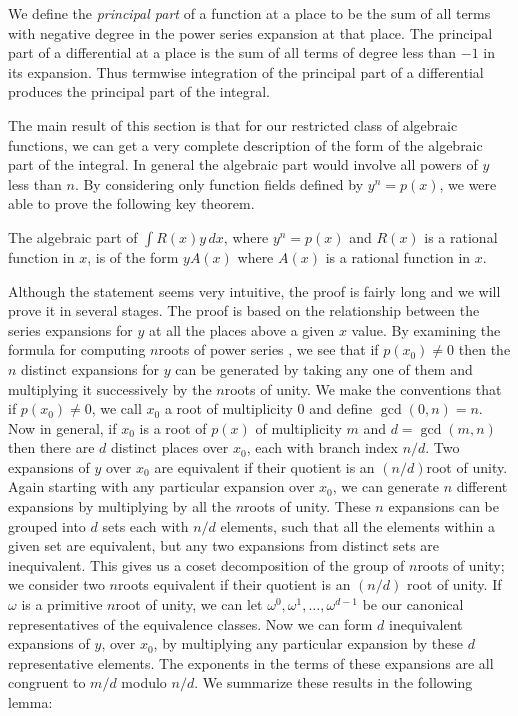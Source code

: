 We define the {\em principal part} of a function at a place to be
the sum of all terms with negative degree in the power series expansion
at that place.  The principal part of a differential  at a place
is the sum of
all terms of degree less than $-1$ in its expansion.  Thus termwise
integration of the principal part of a differential produces the
principal part of the integral.

The main result of this section is that for our restricted
class of algebraic functions, we can get a very complete description
of the form of the algebraic part of the integral.  In general the
algebraic part would involve all powers of $y$ less than $n$.  By considering
only function fields defined by $y^n=p(x)$, we were able to prove the
following key theorem.
	
\begin{theorem}
The algebraic part of $\int R(x)y\,dx$, where $y^n=p(x)$ and $R(x)$ is
a rational function in $x$, is of the form $yA(x)$ where $A(x)$ is a
rational function in $x$.
\end{theorem}

Although the statement seems very intuitive, the proof is
fairly long and we will prove it in several stages.  The proof is based
on the relationship between the series expansions for $y$ at
all the places above a given $x$ value.  By examining the formula for
computing $n$\th roots of power series \cite{Zippel1976-yk}, we
see that if 
$p(x_0) \not= 0$ then the $n$ distinct expansions for $y$ can be generated by
taking any one of them and multiplying it successively by the $n$\th roots
of unity. We make the conventions that if $p(x_0) \not= 0$, we call $x_0$ a root
of multiplicity $0$ and define $\gcd(0,n)=n$.
Now in general, if $x_0$ is a root of $p(x)$ of multiplicity $m$ and 
$d=\gcd(m,n)$ then there are $d$ distinct places over $x_0$, each with
branch index $n/d$. 
Two expansions of $y$ over $x_0$ are equivalent if their quotient is an
$(n/d)$\th root of unity.  Again starting with any particular expansion
over $x_0$, we can generate $n$ different expansions by multiplying by
all the $n$\th roots of unity.
These $n$ expansions can be grouped into $d$ sets each with $n/d$ elements,
such that all the elements within a given set are equivalent, but any
two expansions from distinct sets are inequivalent.  
This gives us a coset decomposition of the group of $n$\th roots of unity;
we consider two $n$\th roots equivalent if their quotient is an $(n/d)$\th
root of unity.  If $\omega$ is a primitive $n$\th root of unity, we can let
$\omega^0, \omega^1, \ldots, \omega^{d-1}$ be our canonical representatives of
the equivalence classes.  Now we can
form $d$ inequivalent expansions  of $y$, over $x_0$,
by multiplying any particular
expansion by these $d$ representative elements.
The exponents in the terms of these expansions are all
congruent to $m/d$ modulo $n/d$.  We summarize these results in the
following lemma:


